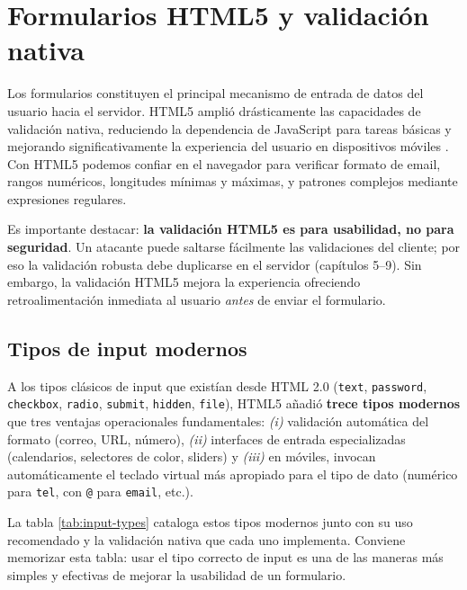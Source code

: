 \section{Formularios HTML5 y validación nativa}

Los formularios constituyen el principal mecanismo de entrada de
datos del usuario hacia el servidor. HTML5 amplió drásticamente las
capacidades de validación nativa, reduciendo la dependencia de
JavaScript para tareas básicas y mejorando significativamente la
experiencia del usuario en dispositivos móviles
\cite{nixon2021learning}. Con HTML5 podemos confiar en el navegador
para verificar formato de email, rangos numéricos, longitudes
mínimas y máximas, y patrones complejos mediante expresiones
regulares.

Es importante destacar: \textbf{la validación HTML5 es para
usabilidad, no para seguridad}. Un atacante puede saltarse fácilmente
las validaciones del cliente; por eso la validación robusta debe
duplicarse en el servidor (capítulos 5--9). Sin embargo, la
validación HTML5 mejora la experiencia ofreciendo retroalimentación
inmediata al usuario \emph{antes} de enviar el formulario.

\subsection{Tipos de input modernos}

A los tipos clásicos de input que existían desde HTML 2.0
(\texttt{text}, \texttt{password}, \texttt{checkbox}, \texttt{radio},
\texttt{submit}, \texttt{hidden}, \texttt{file}), HTML5 añadió
\textbf{trece tipos modernos} que tres ventajas operacionales
fundamentales: \emph{(i)} validación automática del formato (correo,
URL, número), \emph{(ii)} interfaces de entrada especializadas
(calendarios, selectores de color, sliders) y \emph{(iii)} en
móviles, invocan automáticamente el teclado virtual más apropiado
para el tipo de dato (numérico para \texttt{tel}, con \texttt{@}
para \texttt{email}, etc.).

La tabla \ref{tab:input-types} cataloga estos tipos modernos junto
con su uso recomendado y la validación nativa que cada uno
implementa. Conviene memorizar esta tabla: usar el tipo correcto de
input es una de las maneras más simples y efectivas de mejorar la
usabilidad de un formulario.


